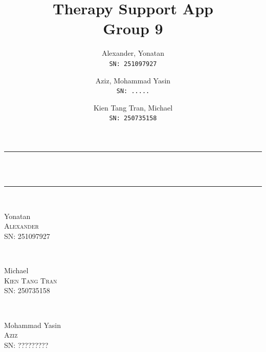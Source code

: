 \documentclass[11pt]{article}
\author{Alexander, Yonatan\\
\texttt{SN: 251097927}
\and
Aziz, Mohammad Yasin\\
\texttt{SN: .....}
\and
Kien Tang Tran, Michael\\
\texttt{SN: 250735158}
}
\title{Therapy Support App\\
\large Group 9}
\begin{document}
    \begin{titlepage} %
        \newcommand{\HRule}{\rule{\linewidth}{0.5mm}} %

        \center %


        \vspace*{1cm}
        \HRule \\[0.4cm]
        { \huge \bfseries \thetitle }\\[0.4cm] %
        \HRule \\[1.5cm]

        \begin{minipage}{0.3\textwidth}
            \Large
            Yonatan\\
            \textsc{Alexander}\\ %
            SN: 251097927
        \end{minipage}
        ~
        \begin{minipage}{0.3\textwidth}
            \Large
            Michael\\
            \textsc{Kien Tang Tran}\\ %
            SN: 250735158
        \end{minipage}
        ~
        \begin{minipage}{0.3\textwidth}
            \Large
            Mohammad Yasin\\
            \textsc{Aziz}\\ %
            SN: ?????????
        \end{minipage}\\[2cm]



\end{titlepage}
\end{document}
